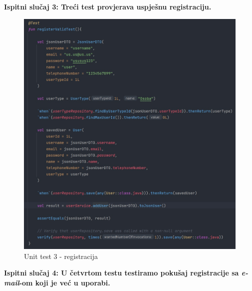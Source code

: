 \pagebreak		
\textbf{Ispitni slučaj 3: Treći test provjerava uspješnu registraciju.}

\begin{figure}[H]
			\includegraphics[scale=0.5]{slike/unit3.PNG} 
			\centering
			\caption{Unit test 3 - registracija}
			\label{unit3}
		\end{figure}
		
\pagebreak		
\textbf{Ispitni slučaj 4: U četvrtom testu testiramo pokušaj registracije sa \textit{e-mail}-om koji je već u uporabi.}

